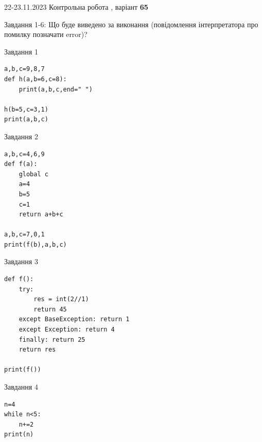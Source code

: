 \documentclass[12pt, ukrainian]{article}
\begin{document}
{{22-23.11.2023 Контрольна робота , варіант  \No \textbf { 65 }\par}}
{

Завдання 1-6: Що буде виведено за виконання (повідомлення інтерпретатора про помилку позначати error)?


\begin{minipage}[t]{9.7cm}                
{\begin{center}Завдання {1}\end{center}}
\begin{verbatim}
a,b,c=9,8,7
def h(a,b=6,c=8):
    print(a,b,c,end=" ")

h(b=5,c=3,1)
print(a,b,c)
\end{verbatim}     
\end{minipage}
\vline \hspace{8mm}
\begin{minipage}[t]{8.0cm}                
{\begin{center}Завдання {2}\end{center}}
\begin{verbatim}
a,b,c=4,6,9
def f(a):
    global c
    a=4
    b=5
    c=1
    return a+b+c

a,b,c=7,0,1
print(f(b),a,b,c)
\end{verbatim}     
\end{minipage}

\vspace{15mm}
\begin{minipage}[t]{9.7cm}                
{\begin{center}Завдання {3}\end{center}}
\begin{verbatim}
def f():
    try:
        res = int(2//1)
        return 45
    except BaseException: return 1
    except Exception: return 4
    finally: return 25
    return res

print(f())
\end{verbatim}     
\end{minipage}
\vline \hspace{8mm}
\begin{minipage}[t]{8.0cm}                
{\begin{center}Завдання {4}\end{center}}
\begin{verbatim}
n=4
while n<5:
    n+=2
print(n)
\end{verbatim}     
\end{minipage}

}
\end{document}
